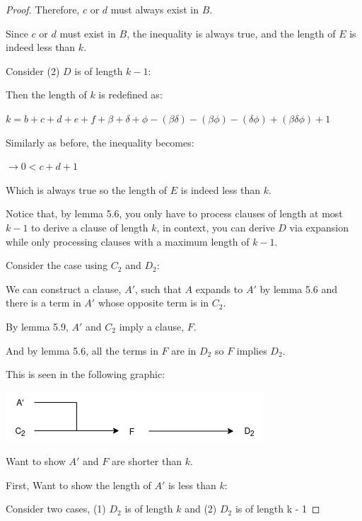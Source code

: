 \documentclass[manuscript]{acmart}
\begin{document}
\begin{proof}
        Therefore, $c$ or $d$ must always exist in $B$.

        Since $c$ or $d$ must exist in $B$, the inequality is always true, 
        and the length of $E$ is indeed less than $k$.

        Consider (2) $D$ is of length $k - 1$:

        Then the length of $k$ is redefined as:

        $k = b + c + d + e + f + \beta + \delta + \phi - (\beta \delta) 
        - (\beta \phi) - (\delta \phi) + (\beta \delta \phi) + 1$

        Similarly as before, the inequality becomes:

        $\rightarrow 0 < c + d + 1$

        Which is always true so the length of $E$ is indeed less than $k$.

        Notice that, by lemma 5.6, you only have to process clauses of length
        at most $k-1$ to derive a clause of length $k$, in context, you 
        can derive $D$ via expansion while only processing clauses with
        a maximum length of $k-1$.


        Consider the case using $C_2$ and $D_2$:

        We can construct a clause, $A'$, such that $A$ expands to $A'$ by 
        lemma 5.6 and there is a term in $A'$ whose opposite term is in $C_2$.

        By lemma 5.9, $A'$ and $C_2$ imply a clause, $F$.

        And by lemma 5.6, all the terms in $F$ are in $D_2$ so $F$ implies $D_2$.

        This is seen in the following graphic:

        \includegraphics[scale=0.8]{318c.png}
        
        Want to show $A'$ and $F$ are shorter than $k$.

        First, Want to show the length of $A'$ is less than $k$:

        Consider two cases, (1) $D_2$ is of length $k$ and 
        (2) $D_2$ is of length k - 1


\end{proof}
\end{document}

